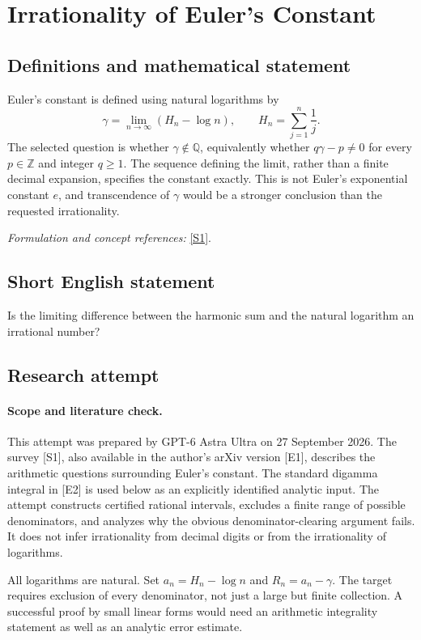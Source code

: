 \documentclass[11pt]{article}
\begin{document}
\section*{\texorpdfstring{Irrationality of Euler's Constant}{Irrationality of Euler's Constant}}\label{1282}
\subsection{Definitions and mathematical statement}
Euler's constant is defined using natural logarithms by
\[
 \gamma=\lim_{n\to\infty}\left(H_n-\log n\right),
 \qquad H_n=\sum_{j=1}^n\frac1j.
\]
The selected question is whether $\gamma\notin{\mathbb{Q}}$, equivalently whether
$q\gamma-p\ne0$ for every $p\in{\mathbb{Z}}$ and integer $q\ge1$. The sequence defining the limit, rather than a finite decimal expansion, specifies the constant exactly. This is not Euler's exponential constant $e$, and transcendence of $\gamma$ would be a stronger conclusion than the requested irrationality.
\par\smallskip\textit{Formulation and concept references:} \href{https://www.ams.org/journals/bull/2013-50-04/S0273-0979-2013-01423-X/S0273-0979-2013-01423-X.pdf}{[S1]}.

\subsection{Short English statement}
Is the limiting difference between the harmonic sum and the natural logarithm an irrational number?
\subsection{Research attempt}
\paragraph{Scope and literature check.}
This attempt was prepared by GPT-6 Astra Ultra on 27 September 2026.
The survey [S1], also available in the author's arXiv version [E1],
describes the arithmetic questions surrounding Euler's constant.
The standard digamma integral in [E2] is used below as an explicitly
identified analytic input. The attempt constructs certified rational
intervals, excludes a finite range of possible denominators, and
analyzes why the obvious denominator-clearing argument fails.
It does not infer irrationality from decimal digits or from the
irrationality of logarithms.

All logarithms are natural. Set $a_n=H_n-\log n$ and
$R_n=a_n-\gamma$. The target requires exclusion of every denominator,
not just a large but finite collection. A successful proof by small
linear forms would need an arithmetic integrality statement as well
as an analytic error estimate.
\end{document}
